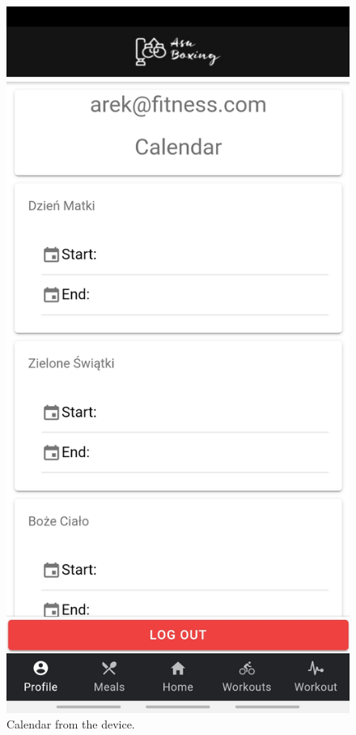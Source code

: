 \documentclass[a4paper,12pt]{report}
\begin{document}
\begin{figure}[ht] 
  \label{ fig7} 
  \begin{minipage}[b]{0.5\linewidth}
    \centering
    \includegraphics[width=.7\linewidth]{images/aplicationImages/calendarTop.jpeg} 
    \caption{Calendar from the device.} 
    \vspace{4ex}
  \end{minipage}%
  \begin{minipage}[b]{0.5\linewidth}
    \centering

\end{minipage}
\end{figure}
\end{document}
